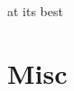 \documentclass{beamer}
\begin{document}
\begin{frame}[containsverbatim]{\TikZ{} at its best}
		\end{frame}
		
		
%		

		\section{Misc}
		
\end{document}
